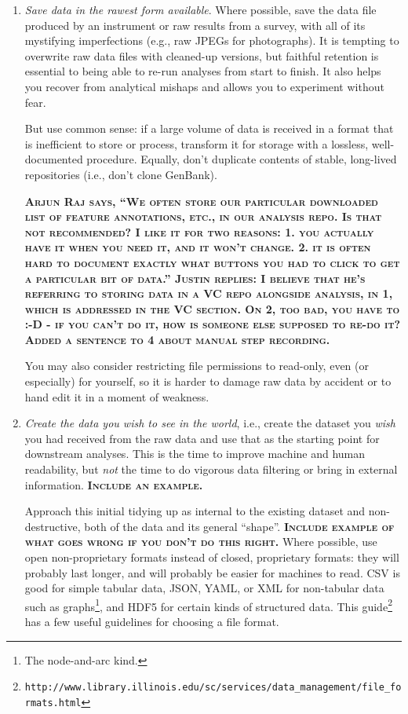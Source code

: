 \documentclass[10pt]{article}
\newcommand{\fixme}[1]{\textsc{\textbf{#1}}}
\newcommand{\recommend}[1]{\textit{#1}}
\newcommand{\withurl}[2]{{#1}\footnote{\texttt{#2}}}
\begin{document}
\begin{enumerate}

\item
  \recommend{Save data in the rawest form available}.  Where possible,
  save the data file produced by an instrument or raw results from a
  survey, with all of its mystifying imperfections (e.g., raw JPEGs
  for photographs). It is tempting to overwrite raw data files with
  cleaned-up versions, but faithful retention is essential to being
  able to re-run analyses from start to finish. It also
  helps you recover from
  analytical mishaps and allows you to experiment without fear.

  But use common sense: if a large volume of data is received in a
  format that is inefficient to store or process, transform it for
  storage with a lossless, well-documented procedure.  Equally, don't
  duplicate contents of stable, long-lived repositories (i.e., don't
  clone GenBank).

  \fixme{Arjun Raj says, ``We often store our
    particular downloaded list of feature annotations, etc., in our
    analysis repo.  Is that not recommended?  I like it for two
    reasons: 1. you actually have it when you need it, and it won't
    change. 2. it is often hard to document exactly what buttons you
    had to click to get a particular bit of data.'' Justin replies: I believe that he's referring to storing data in a VC repo alongside analysis, in 1, which is addressed in the VC section. On 2, too bad, you have to :-D - if you can't do it, how is someone else supposed to re-do it? Added a sentence to 4 about manual step recording.}

  You may also consider restricting file permissions to read-only,
  even (or especially) for yourself, so it is harder to damage raw
  data by accident or to hand edit it in a moment of weakness.

\item
  \recommend{Create the data you wish to see in the world}, i.e.,
  create the dataset you \emph{wish} you had received from the raw
  data and use that as the starting point for downstream analyses.
  This is the time to improve machine and human readability, but
  \emph{not} the time to do vigorous data filtering or bring in
  external information.
  \fixme{Include an example.}

  Approach this initial tidying up as internal to the existing dataset
  and non-destructive, both of the data and its general ``shape''.
  \fixme{Include example of what goes wrong if you don't do this
    right.}  Where possible, use open non-proprietary formats instead
  of closed, proprietary formats: they will probably last longer, and
  will probably be easier for machines to read.  CSV is good for
  simple tabular data, JSON, YAML, or XML for non-tabular data such as
  graphs\footnote{The node-and-arc kind.}, and HDF5 for certain kinds
  of structured data.  \withurl{This
    guide}{http://www.library.illinois.edu/sc/services/data\_management/file\_formats.html}
  has a few useful guidelines for choosing a file format.


\end{enumerate}
\end{document}
